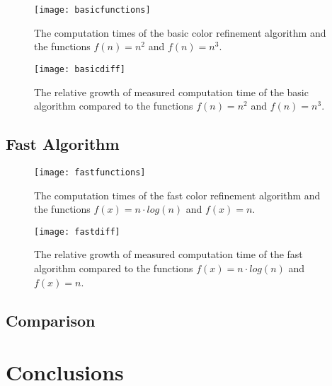 \documentclass[twoside]{article}
\begin{document}
\begin{multicols}{2}
\begin{figure}[H]
	\texttt{[image: basicfunctions]}
	\caption{The computation times of the basic color refinement algorithm and the functions $f(n)=n^2$ and $f(n)=n^3$.}
	\label{fig:basicfunctions}
\end{figure}

\begin{figure}[H]
	\texttt{[image: basicdiff]}
	\caption{The relative growth of measured computation time of the basic algorithm compared to the functions $f(n)=n^2$ and $f(n)=n^3$.}
	\label{fig:basicgrowth}
\end{figure}

\subsection{Fast Algorithm}

\begin{figure}[H]
	\texttt{[image: fastfunctions]}
	\caption{The computation times of the fast color refinement algorithm and the functions $f(x)=n\cdot log(n)$ and $f(x)=n$.}
	\label{fig:fastgrowth}
\end{figure}

\begin{figure}[H]
	\texttt{[image: fastdiff]}
	\caption{The relative growth of measured computation time of the fast algorithm compared to the functions $f(x)=n\cdot log(n)$ and $f(x)=n$.}
	\label{fig:fastfunctions}
\end{figure}

\subsection{Comparison}

\section{Conclusions}
\label{concl}

\label{references}
\printbibliography


\end{multicols}
\end{document}
